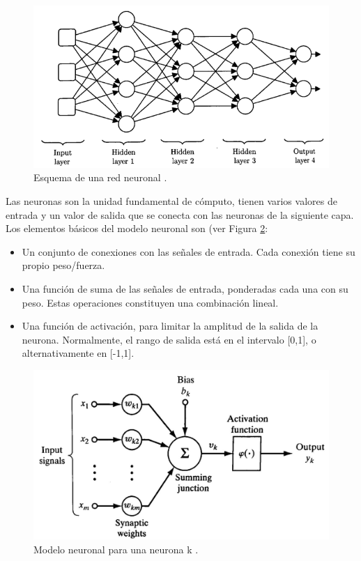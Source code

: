 \begin{figure}[h]
	\centering
	\includegraphics[scale=0.5]{imagenes/cap2/neural-network.png}
	\caption{Esquema de una red neuronal \cite{26}.}
	\label{fig3}
\end{figure}

Las neuronas son la unidad fundamental de cómputo, tienen varios valores de entrada y un valor de salida que se conecta con las neuronas de la siguiente capa. Los elementos básicos del modelo neuronal son (ver Figura \ref{fig4}:

\begin{itemize}
	\item Un conjunto de conexiones con las señales de entrada. Cada conexión tiene su propio peso/fuerza.
	\item Una función de suma de las señales de entrada, ponderadas cada una con su peso. Estas operaciones constituyen una combinación lineal.
	\item Una función de activación, para limitar la amplitud de la salida de la neurona. Normalmente, el rango de salida está en el intervalo [0,1], o alternativamente en [-1,1].
\end{itemize} 

\begin{figure}[h]
	\centering
	\includegraphics[scale=0.25]{imagenes/cap2/neuron-model.png}
	\caption{Modelo neuronal para una neurona k \cite{25}.}
	\label{fig4}
\end{figure}

